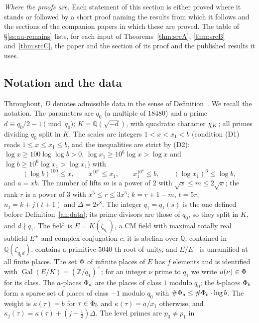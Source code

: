 \documentclass[10pt]{amsart}
\theoremstyle{definition}
\theoremstyle{remark}
\newcommand{\Z}{\mathbb Z}
\newcommand{\Q}{\mathbb Q}
\begin{document}
\emph{Where the proofs are.} Each statement of this section is either proved where it stands or
followed by a short proof naming the results from which it follows and the sections of the companion papers in which
these are proved. The table of \S\ref{ss:au-remains} lists, for each input of Theorems~\ref{thm:srcA},
\ref{thm:srcB} and~\ref{thm:srcC}, the paper and the section of its proof and the published results it uses.

\subsection{Notation and the data}\label{ss:au-notation}

Throughout, $D$ denotes admissible data in the sense of Definition~\auDataRef. We recall the
notation. The parameters are $q_0$ (a multiple of $18480$) and a prime $d\equiv q_0/2-1
\pmod{q_0}$; $K=\Q(\sqrt{-d})$, with quadratic character $\chi_K$; all primes dividing $q_0$ split
in $K$. The scales are integers $1<x<x_1<b$ (condition (D1) reads $1\le x\le x_1\le b$, and the
inequalities are strict by (D2): $\log x\ge100\log\log b>0$, $\log x_1\ge10^6\log x>\log x$ and
$\log b\ge10^6\log x_1>\log x_1$) with
\begin{equation}\label{eq:au-scales}
(\log b)^{100}\le x,\qquad x^{10^6}\le x_1,\qquad x_1^{10^6}\le b,\qquad(\log x_1)^6\le\log b,
\end{equation}
and $a=xb$. The number of lifts $m$ is a power of $2$ with $\sqrt x\le m\le2\sqrt x$; the rank $r$
is a power of $3$ with $x^5\le r\le3x^5$; $k=r+1-m$, $t=5r$, $n_j=k+j(t+1)$ and $\Delta=2r^8$. The
integer $q_1=q_1(s)$ is the one defined before Definition~\ref{an:data}; its prime divisors are
those of $q_0$, so they split in $K$, and $d\nmid q_1$. The
field is $E=K(\zeta_{q_1})$, a CM field with maximal totally real subfield $E^+$ and complex
conjugation $c$; it is abelian over $\Q$, contained in $\Q(\zeta_{q_1d})$, contains a primitive
$5040$-th root of unity, and $E/E^+$ is unramified at all finite places. The set $\Phi$ of
infinite places of $E$ has $f$ elements and is identified with $\operatorname{Gal}(E/K)=
(\Z/q_1)^\times$; for an integer $\nu$ prime to $q_1$ we write $u(\nu)\in\Phi$ for its class.
The $a$-places $\Phi_a$ are the places of class $1$ modulo $q_0$; the $b$-places $\Phi_b$ form a
sparse set of places of class $-1$ modulo $q_0$ with $\#\Phi_a\le\#\Phi_b\cdot\log b$. The weight is
$\kappa(\tau)=b$ for $\tau\in\Phi_b$ and $\kappa(\tau)=a/x_1$ otherwise, and
$\kappa_j(\tau)=\kappa(\tau)+(j+\tfrac12)\Delta$. The level primes are $p_0\ne p_1$ in
\end{document}
